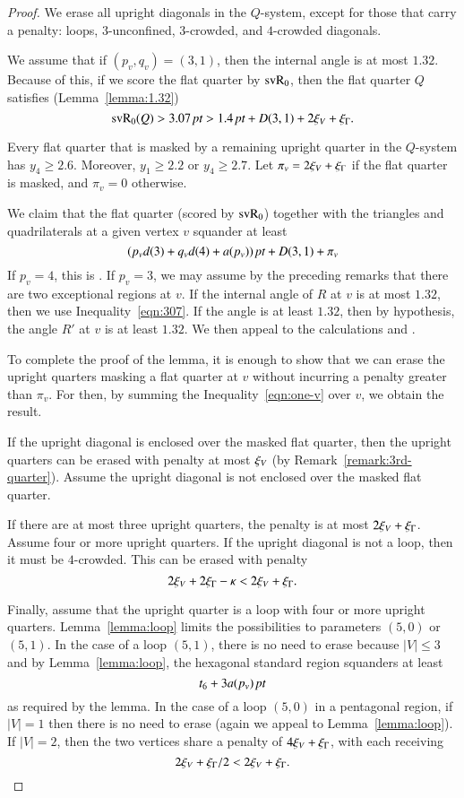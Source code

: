 \begin{proof}   We erase all upright diagonals in the
$Q$-system, except for those that carry a penalty: loops,
$3$-unconfined, $3$-crowded, and $4$-crowded diagonals.

We assume that if $(p_v,q_v)=(3,1)$, then the internal angle is at
most $1.32$. Because of this, if we score the flat quarter by
${\operatorname{svR}}_0$, then the flat quarter $Q$ satisfies
(Lemma~\ref{lemma:1.32})
   \begin{equation}
   {\operatorname{svR}}_0(Q) > 3.07\,\hbox{\it pt} > 1.4\,\hbox{\it pt} + D(3,1) + 2\xi_V + \xi_\Gamma.
   \label{eqn:307}
   \end{equation}



Every flat quarter that is masked by a remaining upright quarter
in the $Q$-system has $y_4\ge2.6$.  Moreover, $y_1\ge2.2$ or
$y_4\ge2.7$.  Let $\pi_v = 2\xi_V + \xi_\Gamma$ if the flat quarter is
masked, and $\pi_v = 0$ otherwise.

We claim that the flat quarter (scored by ${\operatorname{svR}}_0$) together with
the triangles and quadrilaterals at a given vertex $v$ squander at
least
   \begin{equation}
   (p_v d(3) + q_v d(4) + a(p_v))\,\hbox{\it pt} + D(3,1) + \pi_v
   \label{eqn:one-v}
   \end{equation}
If $p_v=4$, this is .  If $p_v=3$, we may assume
by the preceding remarks that there are two exceptional regions at
$v$.  If the internal angle of $R$ at $v$ is at most $1.32$, then
we use Inequality~\ref{eqn:307}.  If the angle is at least $1.32$,
then by hypothesis, the angle $R'$ at $v$ is at least $1.32$.  We
then appeal to the calculations  and
.

To complete the proof of the lemma, it is enough to show that we
can erase the upright quarters masking a flat quarter at $v$
without incurring a penalty greater than $\pi_v$.  For then, by
summing the Inequality~\ref{eqn:one-v} over $v$, we obtain the
result.

If the upright diagonal is enclosed over the masked flat quarter,
then the upright quarters can be erased with penalty at most
$\xi_V$ (by Remark~\ref{remark:3rd-quarter}). Assume the upright
diagonal is not enclosed over the masked flat quarter.

If there are at most three upright quarters, the penalty is at
most $2\xi_V + \xi_\Gamma$.  Assume four or more upright quarters.  If
the upright diagonal is not a loop, then it must be $4$-crowded.
This can be erased with penalty
   $$2\xi_V + 2\xi_\Gamma - \kappa < 2\xi_V + \xi_\Gamma.$$

Finally, assume that the upright quarter is a loop with four or
more upright quarters.  Lemma~\ref{lemma:loop} limits the
possibilities to parameters $(5,0)$ or $(5,1)$.  In the case of a
loop $(5,1)$, there is no need to erase because $|V|\le3$ and by
Lemma~\ref{lemma:loop}, the hexagonal standard region squanders at
least
   $$t_6 + 3 a(p_v)\,\hbox{\it pt}$$
as required by the lemma.  In the case of a loop $(5,0)$ in a
pentagonal region, if $|V|=1$ then there is no need to erase
(again we appeal to Lemma~\ref{lemma:loop}).  If $|V| =2$, then
the two vertices share a penalty of $4\xi_V + \xi_\Gamma$, with each
receiving
   $$2\xi_V + \xi_\Gamma/2 < 2\xi_V +\xi_\Gamma.$$
\end{proof}
